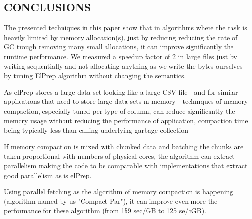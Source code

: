 \documentclass[a4paper,twoside]{article}
\begin{document}
\subsection{\uppercase{Conclusions}}\label{subsec:uppercase2}

The presented techniques in this paper show that in algorithms where the task is heavily limited by memory allocation(s), just by reducing reducing the rate of GC trough removing many small allocations, it can improve significantly the runtime performance.
We measured a speedup factor of 2 in large files just by writing sequentially and not allocating anything as we write the bytes ourselves by tuning ElPrep algorithm without changing the semantics.

As elPrep stores a large data-set looking like a large CSV file - and for similar applications that need to store large data sets in memory - techniques of memory compaction, especially tuned per type of column, 
can reduce significantly the memory usage without reducing the performance of  application, compaction time being typically less than calling underlying garbage collection.

If memory compaction is mixed with chunked data and batching the chunks are taken proportional with numbers of physical cores, the algorithm can extract parallelism making the code to be comparable with implementations that extract good parallelism as is elPrep.

Using parallel fetching as the algorithm of memory compaction is happening (algorithm named by us "Compact Par"), it can improve even more the performance for these algorithm (from 159 sec/GB to 125 se/cGB).
\end{document}

